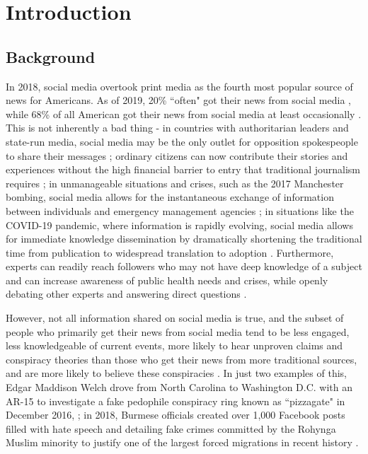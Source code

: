 \documentclass[preprint,review,12pt]{elsarticle}
\begin{document}
\section{Introduction}
\label{introduction}
\subsection{Background}
 In 2018, social media overtook print media as the fourth most popular source of news for Americans. As of 2019, 20\% ``often" got their news from social media \cite{shearer2018social}, while 68\% of all American got their news from social media at least occasionally \cite{matsa2018news}. This is not inherently a bad thing - in countries with authoritarian leaders and state-run media, social media may be the only outlet for opposition spokespeople to share their messages \cite{walker2014breaking}; ordinary citizens can now contribute their stories and experiences without the high financial barrier to entry that traditional journalism requires \cite{qualman2012socialnomics, tapscott2008wikinomics}; in unmanageable situations and crises, such as the 2017 Manchester bombing, social media allows for the instantaneous exchange of information between individuals and emergency management agencies \cite{mirbabaie2020breaking, eriksson2016facebook}; in situations like the COVID-19 pandemic, where information is rapidly evolving, social media allows for immediate knowledge dissemination by dramatically shortening the traditional time from publication to widespread translation to adoption \cite{chan2020social}. Furthermore, experts can readily reach followers who may not have deep knowledge of a subject and can increase awareness of public health needs and crises, while openly debating other experts and answering direct questions \cite{gottlieb2020information}.

However, not all information shared on social media is true, and the subset of people who primarily get their news from social media tend to be less engaged, less knowledgeable of current events, more likely to hear unproven claims and conspiracy theories than those who get their news from more traditional sources, and are more likely to believe these conspiracies \cite{mitchell2020americans}. In just two examples of this, Edgar Maddison Welch drove from North Carolina to Washington D.C. with an AR-15 to investigate a fake pedophile conspiracy ring known as ``pizzagate" in December 2016, \cite{goldman2016comet}; in 2018, Burmese officials created over 1,000 Facebook posts filled with hate speech and detailing fake crimes committed by the Rohynga Muslim minority to justify one of the largest forced migrations in recent history \cite{subedar2018country}.
\end{document}

